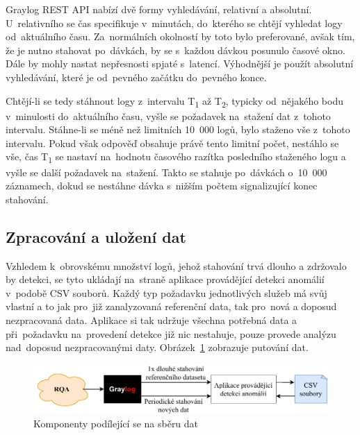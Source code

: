 Graylog REST API nabízí dvě formy vyhledávání, relativní a absolutní. U~relativního se čas specifikuje v~minutách, do~kterého se chtějí vyhledat logy od~aktuálního času. Za~normálních okolností by toto bylo preferované, avšak tím, že je nutno stahovat po~dávkách, by se s~každou dávkou posunulo časové okno. Dále by mohly nastat nepřesnosti spjaté s~latencí. Výhodnější je použít absolutní vyhledávání, které je od~pevného začátku do~pevného konce.

Chtějí-li se tedy stáhnout logy z~intervalu T\textsubscript{1} až T\textsubscript{2}, typicky od~nějakého bodu v~minulosti do~aktuálního času, vyšle se požadavek na~stažení dat z~tohoto intervalu. Stáhne-li se méně než limitních 10~000 logů, bylo staženo vše z~tohoto intervalu. Pokud však odpověď obsahuje právě tento limitní počet, nestáhlo se vše, čas T\textsubscript{1} se nastaví na~hodnotu časového razítka posledního staženého logu a vyšle se další požadavek na~stažení. Takto se stahuje po~dávkách o~10~000 záznamech, dokud se nestáhne dávka s~nižším počtem signalizující konec stahování.

\subsection{Zpracování a uložení dat}
\label{zpracovani-a-ulozeni-dat}
Vzhledem k~obrovskému množství logů, jehož stahování trvá dlouho a zdržovalo by detekci, se tyto ukládají na~straně aplikace provádějící detekci anomálií v~podobě CSV souborů. Každý typ požadavku jednotlivých služeb má svůj vlastní a to jak pro~již zanalyzovaná referenční data, tak pro~nová a doposud nezpracovaná data. Aplikace si tak udržuje všechna potřebná data a při~požadavku na~provedení detekce již nic nestahuje, pouze provede analýzu nad~doposud nezpracovanými daty. Obrázek~\ref{log-download-infrastructure-img} zobrazuje putování dat.

\begin{figure}[hbt]
	\centering
	\includegraphics[width=1\textwidth]{obrazky/log-download-infrastructure.pdf}
	\caption{Komponenty podílející se na sběru dat}
	\label{log-download-infrastructure-img}
\end{figure}

